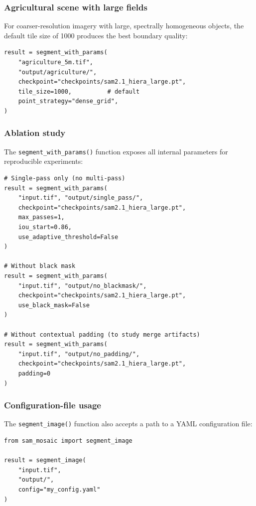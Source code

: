 \documentclass[review,11pt,authoryear]{elsarticle}
\begin{document}
\subsubsection{Agricultural scene with large fields}

For coarser-resolution imagery with large, spectrally homogeneous objects, the default tile size of 1000 produces the best boundary quality:

\begin{lstlisting}[style=python]
result = segment_with_params(
    "agriculture_5m.tif",
    "output/agriculture/",
    checkpoint="checkpoints/sam2.1_hiera_large.pt",
    tile_size=1000,          # default
    point_strategy="dense_grid",
)
\end{lstlisting}

\subsubsection{Ablation study}

The \texttt{segment\_with\_params()} function exposes all internal parameters for reproducible experiments:

\begin{lstlisting}[style=python]
# Single-pass only (no multi-pass)
result = segment_with_params(
    "input.tif", "output/single_pass/",
    checkpoint="checkpoints/sam2.1_hiera_large.pt",
    max_passes=1,
    iou_start=0.86,
    use_adaptive_threshold=False
)

# Without black mask
result = segment_with_params(
    "input.tif", "output/no_blackmask/",
    checkpoint="checkpoints/sam2.1_hiera_large.pt",
    use_black_mask=False
)

# Without contextual padding (to study merge artifacts)
result = segment_with_params(
    "input.tif", "output/no_padding/",
    checkpoint="checkpoints/sam2.1_hiera_large.pt",
    padding=0
)
\end{lstlisting}

\subsubsection{Configuration-file usage}

The \texttt{segment\_image()} function also accepts a path to a YAML configuration file:

\begin{lstlisting}[style=python]
from sam_mosaic import segment_image

result = segment_image(
    "input.tif",
    "output/",
    config="my_config.yaml"
)
\end{lstlisting}
\end{document}
